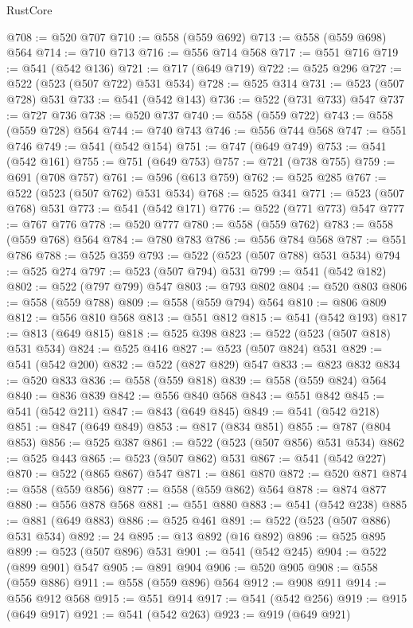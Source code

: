 \begin{lexlean}{RustCore}
\begin{coremodule}
@708 := @520 @707
@710 := @558 (@559 @692)
@713 := @558 (@559 @698) @564
@714 := @710 @713
@716 := @556 @714 @568
@717 := @551 @716
@719 := @541 (@542 @136)
@721 := @717 (@649 @719)
@722 := @525 @296
@727 := @522 (@523 (@507 @722) @531 @534)
@728 := @525 @314
@731 := @523 (@507 @728) @531
@733 := @541 (@542 @143)
@736 := @522 (@731 @733) @547
@737 := @727 @736
@738 := @520 @737
@740 := @558 (@559 @722)
@743 := @558 (@559 @728) @564
@744 := @740 @743
@746 := @556 @744 @568
@747 := @551 @746
@749 := @541 (@542 @154)
@751 := @747 (@649 @749)
@753 := @541 (@542 @161)
@755 := @751 (@649 @753)
@757 := @721 (@738 @755)
@759 := @691 (@708 @757)
@761 := @596 (@613 @759)
@762 := @525 @285
@767 := @522 (@523 (@507 @762) @531 @534)
@768 := @525 @341
@771 := @523 (@507 @768) @531
@773 := @541 (@542 @171)
@776 := @522 (@771 @773) @547
@777 := @767 @776
@778 := @520 @777
@780 := @558 (@559 @762)
@783 := @558 (@559 @768) @564
@784 := @780 @783
@786 := @556 @784 @568
@787 := @551 @786
@788 := @525 @359
@793 := @522 (@523 (@507 @788) @531 @534)
@794 := @525 @274
@797 := @523 (@507 @794) @531
@799 := @541 (@542 @182)
@802 := @522 (@797 @799) @547
@803 := @793 @802
@804 := @520 @803
@806 := @558 (@559 @788)
@809 := @558 (@559 @794) @564
@810 := @806 @809
@812 := @556 @810 @568
@813 := @551 @812
@815 := @541 (@542 @193)
@817 := @813 (@649 @815)
@818 := @525 @398
@823 := @522 (@523 (@507 @818) @531 @534)
@824 := @525 @416
@827 := @523 (@507 @824) @531
@829 := @541 (@542 @200)
@832 := @522 (@827 @829) @547
@833 := @823 @832
@834 := @520 @833
@836 := @558 (@559 @818)
@839 := @558 (@559 @824) @564
@840 := @836 @839
@842 := @556 @840 @568
@843 := @551 @842
@845 := @541 (@542 @211)
@847 := @843 (@649 @845)
@849 := @541 (@542 @218)
@851 := @847 (@649 @849)
@853 := @817 (@834 @851)
@855 := @787 (@804 @853)
@856 := @525 @387
@861 := @522 (@523 (@507 @856) @531 @534)
@862 := @525 @443
@865 := @523 (@507 @862) @531
@867 := @541 (@542 @227)
@870 := @522 (@865 @867) @547
@871 := @861 @870
@872 := @520 @871
@874 := @558 (@559 @856)
@877 := @558 (@559 @862) @564
@878 := @874 @877
@880 := @556 @878 @568
@881 := @551 @880
@883 := @541 (@542 @238)
@885 := @881 (@649 @883)
@886 := @525 @461
@891 := @522 (@523 (@507 @886) @531 @534)
@892 := 24
@895 := @13 @892 (@16 @892)
@896 := @525 @895
@899 := @523 (@507 @896) @531
@901 := @541 (@542 @245)
@904 := @522 (@899 @901) @547
@905 := @891 @904
@906 := @520 @905
@908 := @558 (@559 @886)
@911 := @558 (@559 @896) @564
@912 := @908 @911
@914 := @556 @912 @568
@915 := @551 @914
@917 := @541 (@542 @256)
@919 := @915 (@649 @917)
@921 := @541 (@542 @263)
@923 := @919 (@649 @921)

\end{coremodule}
\end{lexlean}
